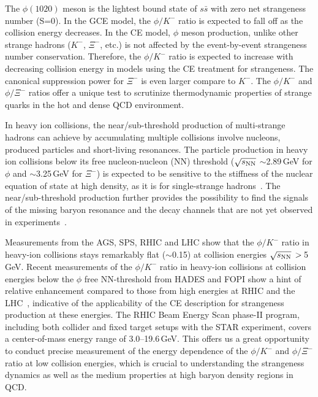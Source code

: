 \documentclass[%
 reprint,	
showpacs,
 amsmath,amssymb,
 aps,
 prc,
]{revtex4-1}
\begin{document}
The $\phi(1020)$ meson is the lightest bound state of $s\bar{s}$ with zero net strangeness number (S=0). %
In the GCE model, the $\phi/K^-$ ratio is expected to fall off as the collision energy decreases. In the CE model, $\phi$ meson production, unlike other strange hadrons ($K^-$, $\Xi^-$, etc.) is not affected by the event-by-event strangeness number conservation.
Therefore, the $\phi/K^-$ ratio is expected to increase with decreasing collision energy in models using the CE treatment for strangeness. The canonical suppression power for $\Xi^-$ is even larger compare to $K^-$. The $\phi/K^-$ and $\phi/\Xi^-$ ratios offer a unique test to scrutinize thermodynamic properties of strange quarks in the hot and dense QCD environment.

In heavy ion collisions, the near/sub-threshold production of multi-strange hadrons can achieve by accumulating multiple collisions involve nucleons, produced particles and short-living resonances. The particle production in heavy ion collisions below its free nucleon-nucleon (NN) threshold ($\sqrt{s_{\rm NN}}$ $\sim$2.89\,GeV for $\phi$ and $\sim$3.25\,GeV for $\Xi^-$) is expected to be sensitive to the stiffness of the nuclear equation of state at high density, as it is for single-strange hadrons~\cite{KO.PhysRevLett.55.2661,FUCHS20061_kaons}. The near/sub-threshold production further provides the possibility to find the signals of the missing baryon resonance and the decay channels that are not yet observed in experiments~\cite{Steinheimer_2015_UrQMD,KO_sQM17}. 

Measurements from the AGS, SPS, RHIC and LHC show that the $\phi/K^-$ ratio in heavy-ion collisions stays remarkably flat ($\sim$0.15) at collision energies $\sqrt{s_{\rm NN}}\,>\,$5\,GeV. Recent measurements of the $\phi/K^-$ ratio in heavy-ion collisions at collision energies below the $\phi$ free NN-threshold from HADES and FOPI show a hint of relative enhancement compared to those from high energies at RHIC and the LHC~\cite{E917_phi,NA49_phi,FOPI_phi_AlAl,FOPI_phi_NiNi,HADES_phi_ArKCl,HADES_phi_AuAu}, indicative of the applicability of the CE description for strangeness production at these energies. %
The RHIC Beam Energy Scan phase-II program, including both collider and fixed target setups with the STAR experiment, covers a center-of-mass energy range of 3.0--19.6\,GeV. This offers us a great opportunity to conduct precise measurement of the energy dependence of the $\phi/K^-$ and $\phi/\Xi^-$ ratio at low collision energies, which is crucial to understanding the strangeness dynamics as well as the medium properties at high baryon density regions in QCD.
\end{document}
